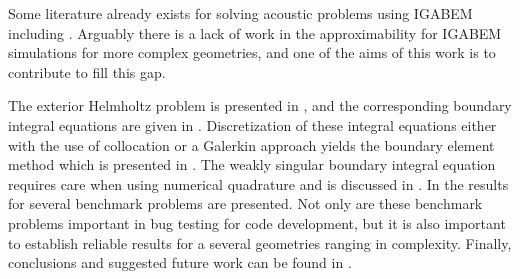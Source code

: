 Some literature already exists for solving acoustic problems using IGABEM including \cite{Simpson2014aib,Keuchel2017eoh,Peake2013eib,Peake2014eai,Peake2015eib,Coox2017aii, Taus2015iaf,Dolz2016aib,Dolz2018afi,Sun2019dib,Wu2020iib}. Arguably there is a lack of work in the approximability for IGABEM simulations for more complex geometries, and one of the aims of this work is to contribute to fill this gap.

The exterior Helmholtz problem is presented in , and the corresponding boundary integral equations are given in . Discretization of these integral equations either with the use of collocation or a Galerkin approach yields the boundary element method which is presented in . The weakly singular boundary integral equation requires care when using numerical quadrature and is discussed in . In  the results for several benchmark problems are presented. Not only are these benchmark problems important in bug testing for code development, but it is also important to establish reliable results for a several geometries ranging in complexity. Finally, conclusions and suggested future work can be found in . 

